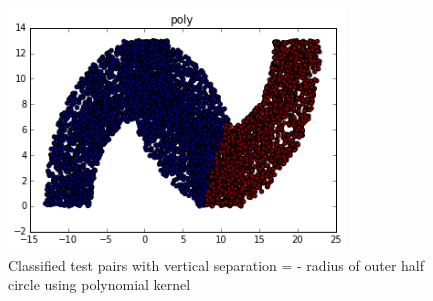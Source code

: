 \documentclass[paper=a4, fontsize=11pt]{scrartcl} %
\numberwithin{equation}{section} %
\numberwithin{figure}{section} %
\numberwithin{table}{section} %
\begin{document}
\begin{figure}[H]
	\centering
  \includegraphics[width=0.8\textwidth]{poly_4.png}
	\caption{Classified test pairs with vertical separation = - radius of outer half circle using polynomial kernel}
	\label{fig_poly4}
\end{figure}
\end{document}
